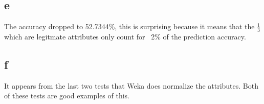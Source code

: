 \documentclass{article}
\begin{document}
\subsection*{e}
The accuracy dropped to 52.7344\%, this is surprising because it means that the $\frac{1}{3}$ which are legitmate attributes only count for ~2\% of the prediction accuracy.\\
\subsection*{f}
It appears from the last two tests that Weka does normalize the attributes. Both of these tests are good examples of this.\\
\end{document}
